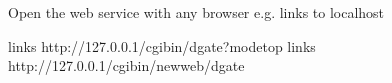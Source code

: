 \documentclass[letterpaper,10pt,english]{sphinxmanual}
\begin{document}
Open the web service with any browser e.g. links to localhost

%
\begin{sphinxVerbatim}[commandchars=\\\{\}]
links http://127.0.0.1/cgi\PYGZhy{}bin/dgate?modetop
links http://127.0.0.1/cgi\PYGZhy{}bin/newweb/dgate
\end{sphinxVerbatim}



\renewcommand{\indexname}{Index}
\printindex
\end{document}
